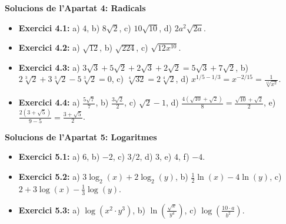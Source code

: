 \documentclass[12pt]{article}
\begin{document}
\begin{solucio}
\textbf{Solucions de l'Apartat 4: Radicals}
\begin{itemize}
    \item \textbf{Exercici 4.1:} a) $4$, b) $8\sqrt{2}$, c) $10\sqrt{10}$, d) $2a^2\sqrt{2a}$.
    \item \textbf{Exercici 4.2:} a) $\sqrt{12}$, b) $\sqrt{224}$, c) $\sqrt{12x^{10}}$.
    \item \textbf{Exercici 4.3:} a) $3\sqrt{3} + 5\sqrt{2} + 2\sqrt{3} + 2\sqrt{2} = 5\sqrt{3} + 7\sqrt{2}$, b) $2\sqrt[3]{2} + 3\sqrt[3]{2} - 5\sqrt[3]{2} = 0$, c) $\sqrt[4]{32} = 2\sqrt[4]{2}$, d) $x^{1/5 - 1/3} = x^{-2/15} = \frac{1}{\sqrt[15]{x^2}}$.
    \item \textbf{Exercici 4.4:} a) $\frac{5\sqrt{7}}{7}$, b) $\frac{3\sqrt{2}}{2}$, c) $\sqrt{2}-1$, d) $\frac{4(\sqrt{10}+\sqrt{2})}{8} = \frac{\sqrt{10}+\sqrt{2}}{2}$, e) $\frac{2(3+\sqrt{5})}{9-5} = \frac{3+\sqrt{5}}{2}$.
\end{itemize}
\end{solucio}

\begin{solucio}
\textbf{Solucions de l'Apartat 5: Logaritmes}
\begin{itemize}
    \item \textbf{Exercici 5.1:} a) $6$, b) $-2$, c) $3/2$, d) $3$, e) $4$, f) $-4$.
    \item \textbf{Exercici 5.2:} a) $3\log_2(x) + 2\log_2(y)$, b) $\frac{1}{2}\ln(x) - 4\ln(y)$, c) $2 + 3\log(x) - \frac{1}{3}\log(y)$.
    \item \textbf{Exercici 5.3:} a) $\log(x^2 \cdot y^3)$, b) $\ln\left(\frac{\sqrt{x}}{y^4}\right)$, c) $\log\left(\frac{10 \cdot a}{b^2}\right)$.
\end{itemize}
\end{solucio}
\end{document}
